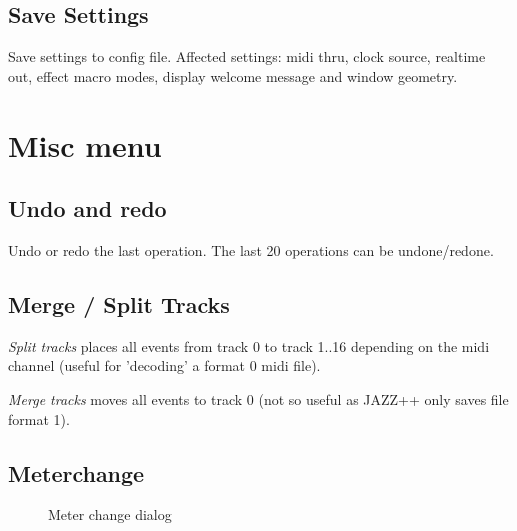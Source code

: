 \documentclass[letterpaper]{report}
\begin{document}
\subsection{Save Settings}
Save settings to config file.
Affected settings: midi thru, clock source, realtime out, effect macro modes,
display welcome message and window geometry.


\section{Misc menu}

\subsection{Undo and redo}\label{undo}

Undo or redo the last operation. The last 20 operations can be undone/redone.


\subsection{Merge / Split Tracks}

{\em Split tracks} places all events from track 0 to track 1..16 depending on
the midi channel (useful for 'decoding' a format 0 midi file).

{\em Merge tracks} moves all events to track 0 (not so useful as JAZZ++ only
saves file format 1).

\subsection{Meterchange}\label{meterchange}

\begin{figure}
\caption{Meter change dialog}
\end{figure}
\end{document}
